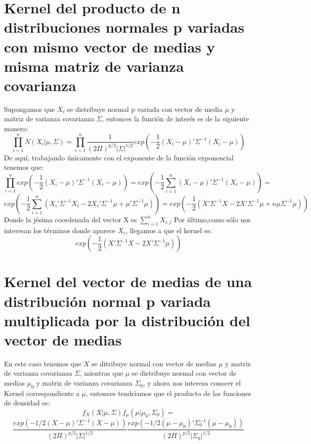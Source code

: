 \documentclass[11pt]{book}
\begin{document}
\section{Kernel del producto de n distribuciones normales p variadas con mismo vector de medias y misma matriz de varianza covarianza}
Supongamos que $X_{i}$ se distribuye normal p variada con vector de media $\mu$ y matriz de varianza covarianza $\Sigma$, entonces la función de  interés es de la siguiente manera:
\begin{equation*}
\prod_{i=1}^{n}N(X_{i}|\mu,\Sigma)=\prod_{i=1}^{n}\dfrac{1}{(2\Pi)^{p/2}|\Sigma|^{1/2}}exp(-\frac{1}{2}(X_{i}-\mu)'\Sigma^{-1}(X_{i}-\mu))
\end{equation*}
De aquí, trabajando únicamente con el exponente de la función exponencial tenemos que:
\begin{equation*}
\prod_{i=1}^{n}exp(-\frac{1}{2}(X_{i}-\mu)'\Sigma^{-1}(X_{i}-\mu))=exp(-\frac{1}{2}\sum_{i=1}^{n} (X_{i}-\mu)'\Sigma^{-1}(X_{i}-\mu))=
\end{equation*} 
\begin{equation*}
exp(-\dfrac{1}{2}\sum_{i=1}^{n}(X_{i}'\Sigma^{-1}X_{i}-2X_{i}'\Sigma^{-1}\mu+\mu'\Sigma^{-1}\mu))=exp(-\frac{1}{2}(X'\Sigma^{-1}X-2X'\Sigma^{-1}\mu+n\mu\Sigma^{-1}\mu))
\end{equation*}
Donde la jésima coordenada del vector X es $\sum_{i=1}^{n}X_{i,j}$
Por último,como sólo nos interesan los términos donde aparece $X_{i}$, llegamos a que el kernel es:
\begin{equation*}
exp(-\frac{1}{2}(X'\Sigma^{-1}X-2X'\Sigma^{-1}\mu))
\end{equation*} 

\section{Kernel del vector de medias de una distribución normal p variada multiplicada por la distribución del vector de medias}

En este caso tenemos que $X$ se ditribuye normal con vector de medias $\mu$ y matriz de varianza covarianza $\Sigma$, mientras que $\mu$ se distribuye normal con vector de medias $\mu_{0}$ y matriz de varianza covarianza $\Sigma_{0}$, y ahora nos interesa conocer el Kernel correspondiente a $\mu$, entonces tendríamos
que el producto de las funciones de densidad es:
\begin{equation*}
f_{X}(X|\mu,\Sigma)f_{\mu}(\mu|\mu_{0},\Sigma_{0})=    
\end{equation*}
\begin{equation*}
\dfrac{exp(-1/2(X-\mu)'\Sigma^{-1}(X-\mu))}{(2\Pi)^{p/2}|\Sigma|^{1/2}}       \dfrac{exp(-1/2(\mu-\mu_{0})'\Sigma_{0}^{-1}(\mu-\mu_{0}))}{(2\Pi)^{p/2}|\Sigma_{0}|^{1/2}}
\end{equation*}
\end{document}
